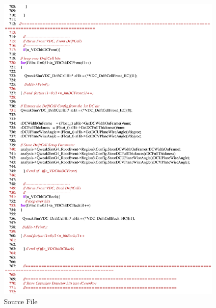 \begin{figure}[h]
  \hspace{0cm}
  \includegraphics[scale=0.8]{./figures13/QweakSimEventAction.cc-p13.eps}
  \caption{Source File}
           \label{fig:XIII-SC-28}
\end{figure}

\clearpage

